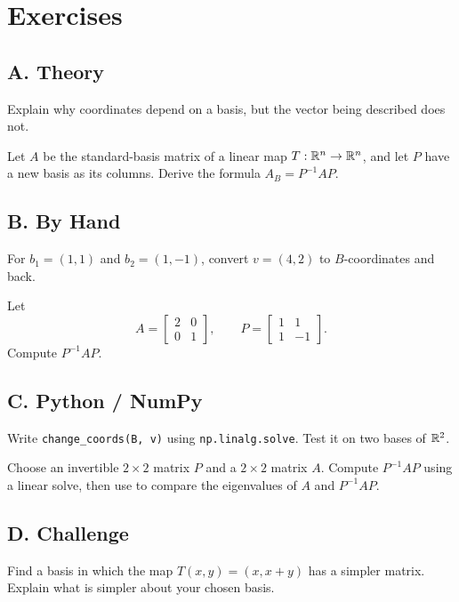 \section*{Exercises}

\subsection*{A. Theory}

\begin{exercise}
Explain why coordinates depend on a basis, but the vector being described does
not.
\end{exercise}

\begin{exercise}
Let $A$ be the standard-basis matrix of a linear map $T:\mathbb{R}^n\to\mathbb{R}^n$, and let
$P$ have a new basis as its columns. Derive the formula $A_B=P^{-1}AP$.
\end{exercise}

\subsection*{B. By Hand}

\begin{exercise}
For $b_1=(1,1)$ and $b_2=(1,-1)$, convert $v=(4,2)$ to $B$-coordinates and
back.
\end{exercise}

\begin{exercise}
Let
\[
  A=\begin{bmatrix}2&0\\0&1\end{bmatrix},
  \qquad
  P=\begin{bmatrix}1&1\\1&-1\end{bmatrix}.
\]
Compute $P^{-1}AP$.
\end{exercise}

\subsection*{C. Python / NumPy}

\begin{exercise}
Write \texttt{change\_coords(B, v)} using \texttt{np.linalg.solve}. Test it
on two bases of $\mathbb{R}^2$.
\end{exercise}

\begin{exercise}
Choose an invertible $2\times 2$ matrix $P$ and a $2\times 2$ matrix $A$.
Compute $P^{-1}AP$ using a linear solve, then use \NumPy{} to compare the
eigenvalues of $A$ and $P^{-1}AP$.
\end{exercise}

\subsection*{D. Challenge}

\begin{exercise}
Find a basis in which the map $T(x,y)=(x,x+y)$ has a simpler matrix. Explain
what is simpler about your chosen basis.
\end{exercise}
